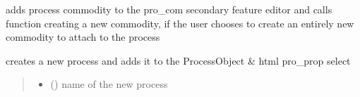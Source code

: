 \documentclass[letterpaper,10pt,english]{sphinxmanual}
\begin{document}
\begin{fulllineitems}
\label{\detokenize{docs_gui/js_api/urbs_editor/process_editor:addCommodityToProcess}}
\pysigstartsignatures
{}
\pysigstopsignatures
\sphinxAtStartPar
adds process commodity to the pro\_com secondary feature editor and calls function creating a new commodity, if the user chooses to create an entirely
new commodity to attach to the process

\end{fulllineitems}


\begin{fulllineitems}
\label{\detokenize{docs_gui/js_api/urbs_editor/process_editor:createNewProcessProperty}}
\pysigstartsignatures
{}
\pysigstopsignatures
\sphinxAtStartPar
creates a new process and adds it to the ProcessObject \& html pro\_prop select
\begin{quote}\begin{description}
\begin{itemize}
\item {} 
\sphinxAtStartPar
{} () \textendash{} name of the new process

\end{itemize}

\end{description}\end{quote}

\end{fulllineitems}

\end{document}
